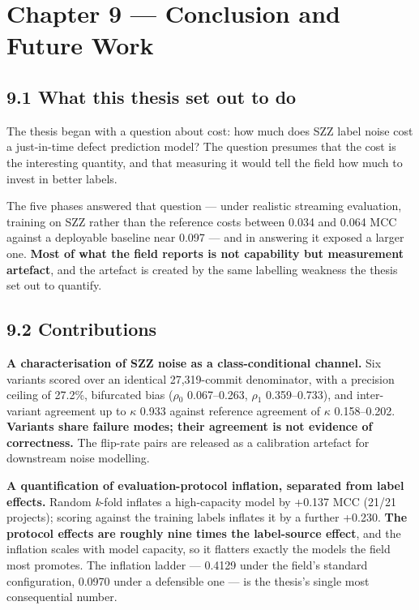 \chapter{Chapter 9 --- Conclusion and Future
Work}\label{chapter-9-conclusion-and-future-work}

\section{9.1 What this thesis set out to
do}\label{what-this-thesis-set-out-to-do}

The thesis began with a question about cost: how much does SZZ label
noise cost a just-in-time defect prediction model? The question presumes
that the cost is the interesting quantity, and that measuring it would
tell the field how much to invest in better labels.

The five phases answered that question --- under realistic streaming
evaluation, training on SZZ rather than the reference costs between
0.034 and 0.064 MCC against a deployable baseline near 0.097 --- and in
answering it exposed a larger one. \textbf{Most of what the field
reports is not capability but measurement artefact}, and the artefact is
created by the same labelling weakness the thesis set out to quantify.

\section{9.2 Contributions}\label{contributions}

\textbf{A characterisation of SZZ noise as a class-conditional channel.}
Six variants scored over an identical 27,319-commit denominator, with a
precision ceiling of 27.2\%, bifurcated bias (\ensuremath{\rho}\ensuremath{_0} 0.067--0.263, \ensuremath{\rho}\ensuremath{_1}
0.359--0.733), and inter-variant agreement up to \ensuremath{\kappa} 0.933 against
reference agreement of \ensuremath{\kappa} 0.158--0.202. \textbf{Variants share failure
modes; their agreement is not evidence of correctness.} The flip-rate
pairs are released as a calibration artefact for downstream noise
modelling.

\textbf{A quantification of evaluation-protocol inflation, separated
from label effects.} Random \emph{k}-fold inflates a high-capacity model
by +0.137 MCC (21/21 projects); scoring against the training labels
inflates it by a further +0.230. \textbf{The protocol effects are
roughly nine times the label-source effect}, and the inflation scales
with model capacity, so it flatters exactly the models the field most
promotes. The inflation ladder --- 0.4129 under the field's standard
configuration, 0.0970 under a defensible one --- is the thesis's single
most consequential number.

